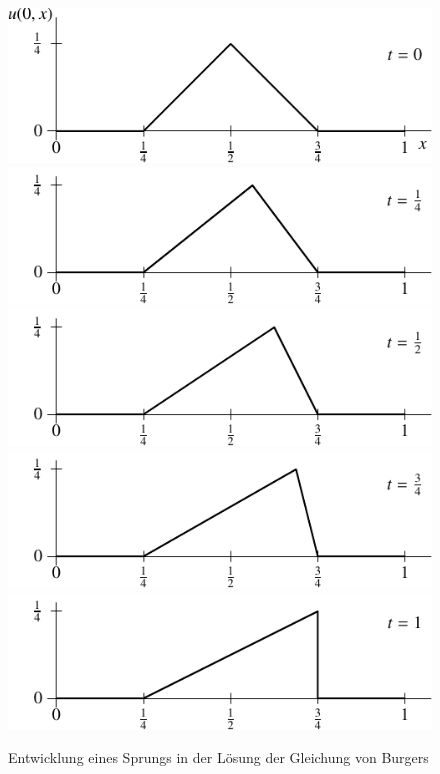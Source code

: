 \begin{figure}
\begin{center}
\includegraphics[width=0.8\hsize]{../common/images/burgers-1}
\includegraphics[width=0.8\hsize]{../common/images/burgers-3}
\includegraphics[width=0.8\hsize]{../common/images/burgers-4}
\includegraphics[width=0.8\hsize]{../common/images/burgers-5}
\includegraphics[width=0.8\hsize]{../common/images/burgers-6}
\end{center}
\caption{Entwicklung eines Sprungs in der Lösung der Gleichung von Burgers\label{burgerssprung}}
\end{figure}


